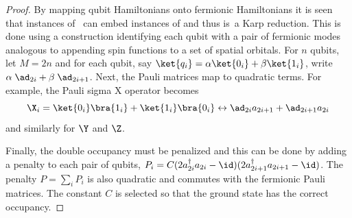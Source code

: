\documentclass[11pt,oneside,final]{huthesis}%
\begin{document}
\begin{proof} By mapping qubit Hamiltonians onto fermionic Hamiltonians it is seen that instances of \FLH~can embed instances of \tLH and thus is~a Karp reduction. This is done using a construction identifying each qubit with a pair of fermionic modes analogous to appending spin functions to a set of spatial orbitals.  For $n$ qubits, let $M=2n$ and for each qubit, say $\ket{q_i}=\alpha\ket{0_i}+\beta\ket{1_i}$, write $\alpha\; \ad_{2i}+\beta\;\ad_{2i+1}$. Next, the Pauli matrices map to quadratic terms. For example, the Pauli sigma X operator becomes
\begin{equation*}
	\X_i=\ket{0_i}\bra{1_i}+\ket{1_i}\bra{0_i}\leftrightarrow\ad_{2i}a_{2i+1}+\ad_{2i+1}a_{2i}
\end{equation*} and similarly for $\Y$ and $\Z$. 

Finally, the double occupancy must be penalized and this can be done by adding a penalty to each pair of qubits, $P_i=C(2a_{2i}^{\dagger}a_{2i}-\id)(2a_{2i+1}^{\dagger}a_{2i+1}-\id)$. The penalty $P=\sum_i P_i$ is also quadratic and commutes with the fermionic Pauli matrices. The constant $C$ is selected so that the ground state has the correct occupancy. 
\end{proof}
\end{document}
